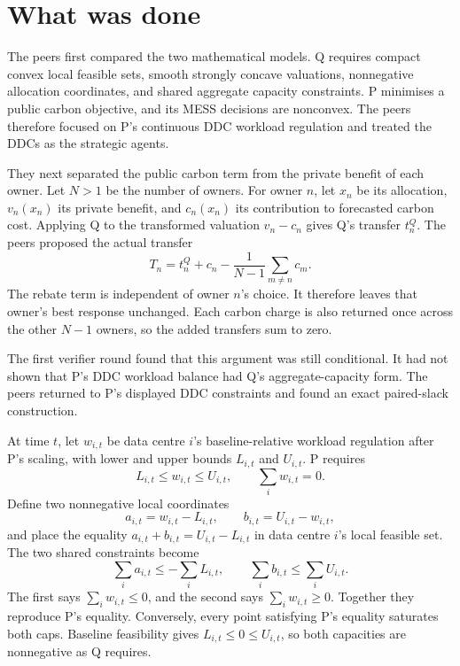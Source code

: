 \documentclass{article}
\begin{document}
\section{What was done}

The peers first compared the two mathematical models.  Q requires compact convex local feasible sets, smooth strongly concave valuations, nonnegative allocation coordinates, and shared aggregate capacity constraints.  P minimises a public carbon objective, and its MESS decisions are nonconvex.  The peers therefore focused on P's continuous DDC workload regulation and treated the DDCs as the strategic agents.

They next separated the public carbon term from the private benefit of each owner.  Let \(N>1\) be the number of owners.  For owner \(n\), let \(x_n\) be its allocation, \(v_n(x_n)\) its private benefit, and \(c_n(x_n)\) its contribution to forecasted carbon cost.  Applying Q to the transformed valuation \(v_n-c_n\) gives Q's transfer \(t_n^Q\).  The peers proposed the actual transfer
\[
 T_n=t_n^Q+c_n-\frac{1}{N-1}\sum_{m\ne n}c_m.
\]
The rebate term is independent of owner \(n\)'s choice.  It therefore leaves that owner's best response unchanged.  Each carbon charge is also returned once across the other \(N-1\) owners, so the added transfers sum to zero.

The first verifier round found that this argument was still conditional.  It had not shown that P's DDC workload balance had Q's aggregate-capacity form.  The peers returned to P's displayed DDC constraints and found an exact paired-slack construction.

At time \(t\), let \(w_{i,t}\) be data centre \(i\)'s baseline-relative workload regulation after P's scaling, with lower and upper bounds \(L_{i,t}\) and \(U_{i,t}\).  P requires
\[
 L_{i,t}\leq w_{i,t}\leq U_{i,t},
 \qquad \sum_i w_{i,t}=0.
\]
Define two nonnegative local coordinates
\[
 a_{i,t}=w_{i,t}-L_{i,t},
 \qquad b_{i,t}=U_{i,t}-w_{i,t},
\]
and place the equality \(a_{i,t}+b_{i,t}=U_{i,t}-L_{i,t}\) in data centre \(i\)'s local feasible set.  The two shared constraints become
\[
 \sum_i a_{i,t}\leq-\sum_i L_{i,t},
 \qquad
 \sum_i b_{i,t}\leq\sum_i U_{i,t}.
\]
The first says \(\sum_i w_{i,t}\leq0\), and the second says \(\sum_i w_{i,t}\geq0\).  Together they reproduce P's equality.  Conversely, every point satisfying P's equality saturates both caps.  Baseline feasibility gives \(L_{i,t}\leq0\leq U_{i,t}\), so both capacities are nonnegative as Q requires.
\end{document}
